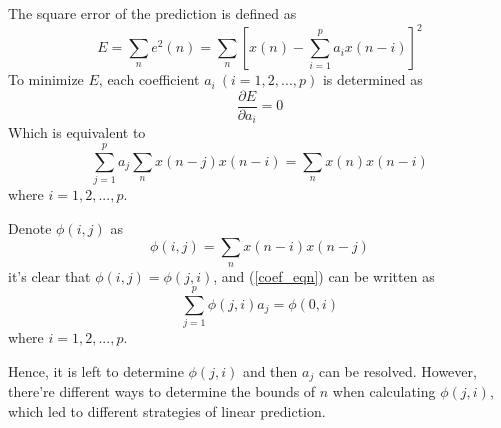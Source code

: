 \documentclass[preprint,12pt]{elsarticle}
\begin{document}
The square error of the prediction is defined as
\begin{equation}
	E = \sum_{n}e^2(n) = \sum_{n}[x(n) - \sum_{i=1}^{p}a_i x(n-i)]^2
\end{equation}
To minimize $E$, each coefficient $a_i\ (i = 1, 2, ..., p)$ is determined as
\begin{equation}
	\frac{\partial E}{\partial a_i} = 0
\end{equation}
Which is equivalent to
\begin{equation}\label{coef_eqn}
	\sum_{j=1}^{p}a_j \sum_{n}x(n-j)x(n-i) = \sum_{n}x(n)x(n-i)
\end{equation}
where $i= 1, 2, ..., p$.

Denote $\phi(i,j)$ as
\begin{equation}\label{phi_def}
	\phi(i, j) = \sum_{n}x(n-i)x(n-j) 
\end{equation}
it's clear that $\phi(i,j) = \phi(j, i)$, and (\ref{coef_eqn}) can be written as
\begin{equation}
	\sum_{j=1}^{p} \phi(j, i)a_j = \phi(0, i)
\end{equation}
where $i= 1, 2, ..., p$.

Hence, it is left to determine $\phi(j, i)$ and then $a_j$ can be resolved. However, there're different ways to determine the bounds of $n$ when calculating $\phi(j, i)$, which led to different strategies of linear prediction.
\end{document}
